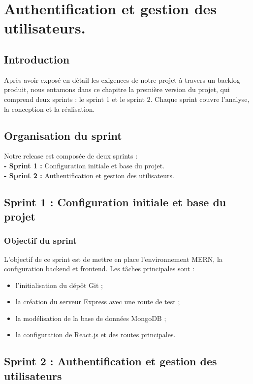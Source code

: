 \chapter{Authentification et gestion des utilisateurs.}


\section*{Introduction}
Après avoir exposé en détail les exigences de notre projet à travers un backlog produit, nous entamons dans ce chapitre la première version du projet, qui comprend deux sprints : le sprint 1 et le sprint 2. Chaque sprint couvre l’analyse, la conception et la réalisation.

\section{Organisation du sprint}
Notre release est composée de deux sprints :\\
\textbf{- Sprint 1 :} Configuration initiale et base du projet.\\
\textbf{- Sprint 2 :} Authentification et gestion des utilisateurs.

\section{Sprint 1 : Configuration initiale et base du projet}
\subsection{Objectif du sprint}
L'objectif de ce sprint est de mettre en place l’environnement MERN, la configuration backend et frontend. Les tâches principales sont :
\begin{itemize}
    \item l'initialisation du dépôt Git ;
    \item la création du serveur Express avec une route de test ;
    \item la modélisation de la base de données MongoDB ;
    \item la configuration de React.js et des routes principales.
\end{itemize}

\section{Sprint 2 : Authentification et gestion des utilisateurs}
